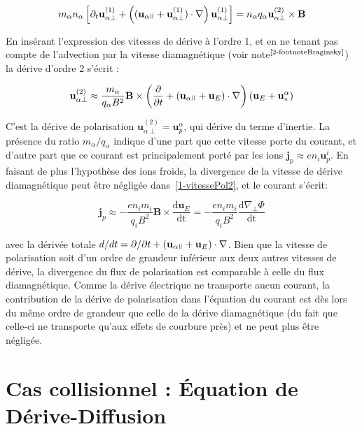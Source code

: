 \begin{refsection}
\begin{equation}
m_\alpha n_\alpha\left[\partial_t \mathbf{u}^{(1)}_{\alpha\perp} +
\left((\mathbf{u}_{\alpha\para}+\mathbf
u^{(1)}_{\alpha\perp})\cdot\nabla\right)\mathbf{u}^{(1)}_{\alpha\perp}\right]
=n_\alpha q_\alpha\mathbf u^{(2)}_{\alpha\perp}\times \mathbf
B
\end{equation}

En insérant l'expression des vitesses de dérive à l'ordre 1, et en ne tenant pas
compte de l'advection par la vitesse diamagnétique (voir
note$^\text{\ref{2-footnoteBraginsky}}$) la dérive d'ordre 2 s'écrit :

\begin{equation}
\label{1-vitessePol2}
\mathbf{u}_{\alpha\perp}^{(2)}\approx\frac{m_\alpha}{q_\alpha
B^2}\mathbf
B\times\left(\frac{\partial}{\partial{t}}+(\mathbf
u_{\alpha\para}+\mathbf u_{E})\cdot\nabla\right)(\mathbf u_E +
\mathbf u^\alpha_*)
\end{equation}

C'est la dérive de polarisation $\mathbf{u}_{\alpha\perp}^{(2)}=\mathbf
u^\alpha_p$, qui dérive du terme d'inertie. 
La présence du ratio $m_\alpha/q_\alpha$ indique
d'une part que cette vitesse porte du courant, et d'autre part que ce
courant est principalement porté par les ions $\mathbf{j}_p\approx en_i\mathbf
u^i_p$. En faisant de plus l'hypothèse des ions froids, la divergence de la vitesse de dérive diamagnétique peut être
négligée dans~\eqref{1-vitessePol2}, et le courant s'écrit:

\begin{equation}
\label{1-courantPol}
\mathbf{j}_p \approx-\frac{en_im_i}{q_i
B^2}\mathbf B\times\frac{\text{d}\mathbf u_E}{\text{dt}}=
-\frac{en_im_i}{q_i B^2}\frac{\text{d}\nabla_\perp \Phi}{\text{dt}}
\end{equation}

avec la dérivée totale $d/dt=\partial/\partial t + (\mathbf
u_{\alpha\para}+\mathbf u_{E})\cdot\nabla$. Bien que la vitesse de
polarisation soit d'un ordre de grandeur inférieur aux deux autres vitesses de dérive, la divergence du flux 
de polarisation est comparable à celle du flux diamagnétique. Comme
la dérive électrique ne transporte aucun courant, la
contribution de la dérive de polarisation dans
l'équation du courant est dès lors du même ordre de
grandeur que celle de la dérive diamagnétique (du fait que celle-ci ne
transporte qu'aux effets de courbure près) et ne peut plus être négligée.

\section{Cas collisionnel : Équation de Dérive-Diffusion}
\label{1-transportAmbipolaire}

\end{refsection}
